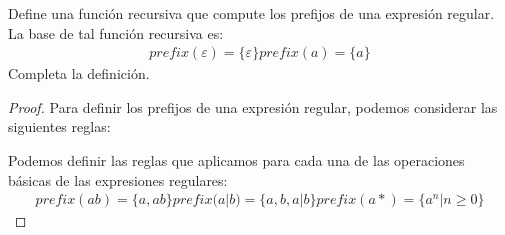 \begin{Pro}
Define una función recursiva que compute los prefijos de una expresión regular. La
base de tal función recursiva es: 
\begin{align*}
    prefix(\varepsilon) = \{\varepsilon\}
    prefix(a) = \{a\}
\end{align*}
Completa la definición. 
\end{Pro}

\begin{proof}
    \hspace{5mm}
Para definir los prefijos de una expresión regular, podemos considerar las siguientes reglas:

Podemos definir las reglas que aplicamos para cada una de las operaciones básicas de las expresiones regulares:
\begin{align*}
    prefix(ab) = \{a, ab\}
    prefix(a|b) = \{a, b, a|b\}
    prefix(a*) = \{a^n | n \geq 0\}
\end{align*}
\end{proof}